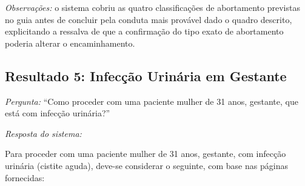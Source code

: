 \documentclass[conference,a4paper]{IEEEtran}
\begin{document}
\medskip
\noindent\textit{Observações:} o sistema cobriu as quatro
classificações de abortamento previstas no guia antes de
concluir pela conduta mais provável dado o quadro descrito,
explicitando a ressalva de que a confirmação do tipo exato de
abortamento poderia alterar o encaminhamento.

\subsection{Resultado 5: Infecção Urinária em Gestante}

\noindent\textit{Pergunta:} ``Como proceder com uma paciente
mulher de 31 anos, gestante, que está com infecção urinária?''

\medskip
\noindent\textit{Resposta do sistema:}

Para proceder com uma paciente mulher de 31 anos, gestante, com
infecção urinária (cistite aguda), deve-se considerar o seguinte,
com base nas páginas fornecidas:
\end{document}
